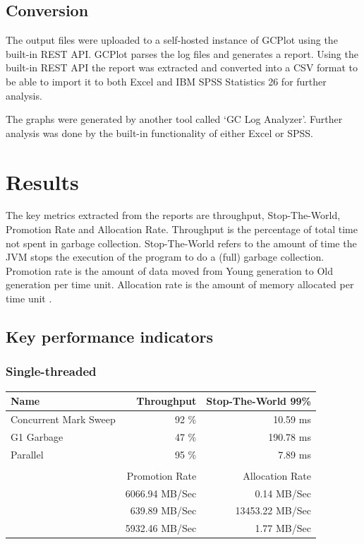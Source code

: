 \documentclass[11pt,a4paper]{article}
\begin{document}
\subsection{Conversion}
The output files were uploaded to a self-hosted instance of GCPlot using the built-in REST API. GCPlot parses the log files and generates a report. Using the built-in REST API the report was extracted and converted into a CSV format to be able to import it to both Excel and IBM SPSS Statistics 26 for further analysis.

The graphs were generated by another tool called `GC Log Analyzer'. Further analysis was done by the built-in functionality of either Excel or SPSS.

\newpage
\section{Results}
The key metrics extracted from the reports are throughput, Stop-The-World, Promotion Rate and Allocation Rate. Throughput is the percentage of total time not spent in garbage collection. Stop-The-World refers to the amount of time the JVM stops the execution of the program to do a (full) garbage collection. Promotion rate is the amount of data moved from Young generation to Old generation per time unit. Allocation rate is the amount of memory allocated per time unit \cite{PLUMBR_BLOG}.

\subsection{Key performance indicators}
\subsubsection*{Single-threaded}
\begin{tabular}{lrr}
\hline
Name                    & Throughput          & Stop-The-World 99\%   \\ \hline
Concurrent Mark Sweep   & 92 \%               & 10.59 ms              \\
G1 Garbage              & 47 \%               & 190.78 ms             \\
Parallel                & 95 \%               & 7.89 ms               \\
&&\\
\hline
                        & Promotion Rate      & Allocation Rate       \\ \hline
                        & 6066.94 MB/Sec      & 0.14 MB/Sec           \\
                        & 639.89 MB/Sec       & 13453.22 MB/Sec       \\
                        & 5932.46 MB/Sec      & 1.77 MB/Sec
\end{tabular}
\end{document}
